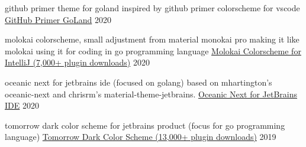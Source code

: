 
\begin{cventries}

  \cventry
    {github primer theme for goland inspired by github primer colorscheme for vscode}
    {\href{https://www.github.com/n0nz/github-primer-goland}{GitHub Primer GoLand}}
    {}
    {2020}
    {
    }

    \cventry
    {molokai colorscheme, small adjustment from material monokai pro making it like molokai using it for coding in go programming language}
    {\href{https://www.github.com/n0nz/intellij-color-molokai}{Molokai Colorscheme for IntelliJ (7,000+ plugin downloads)}}
    {}
    {2020}
    {
    }

    \cventry
    {oceanic next for jetbrains ide (focused on golang) based on mhartington's oceanic-next and chrisrm's material-theme-jetbrains.}
    {\href{https://www.github.com/n0nz/oceanic-next-jetbrains}{Oceanic Next for JetBrains IDE}}
    {}
    {2020}
    {
    }

    \cventry
    {tomorrow dark color scheme for jetbrains product (focus for go programming language)}
    {\href{https://github.com/n0nz/jetbrains-tomorrow-dark}{Tomorrow Dark Color Scheme (13,000+ plugin downloads)}}
    {}
    {2019}
    {
    }
\end{cventries}
